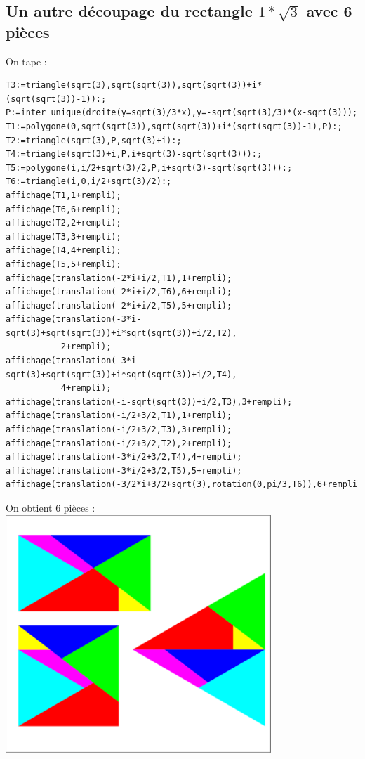\documentclass[a4paper,11pt]{book}
\begin{document}
\subsection{Un autre d\'ecoupage du rectangle $1*\sqrt3$ avec 6 pi\`eces}
On tape :
\begin{verbatim}
T3:=triangle(sqrt(3),sqrt(sqrt(3)),sqrt(sqrt(3))+i*(sqrt(sqrt(3))-1)):;
P:=inter_unique(droite(y=sqrt(3)/3*x),y=-sqrt(sqrt(3)/3)*(x-sqrt(3)));
T1:=polygone(0,sqrt(sqrt(3)),sqrt(sqrt(3))+i*(sqrt(sqrt(3))-1),P):;
T2:=triangle(sqrt(3),P,sqrt(3)+i):;
T4:=triangle(sqrt(3)+i,P,i+sqrt(3)-sqrt(sqrt(3))):;
T5:=polygone(i,i/2+sqrt(3)/2,P,i+sqrt(3)-sqrt(sqrt(3))):;
T6:=triangle(i,0,i/2+sqrt(3)/2):;
affichage(T1,1+rempli);
affichage(T6,6+rempli);
affichage(T2,2+rempli);
affichage(T3,3+rempli);
affichage(T4,4+rempli);
affichage(T5,5+rempli);
affichage(translation(-2*i+i/2,T1),1+rempli);
affichage(translation(-2*i+i/2,T6),6+rempli);
affichage(translation(-2*i+i/2,T5),5+rempli);
affichage(translation(-3*i-sqrt(3)+sqrt(sqrt(3))+i*sqrt(sqrt(3))+i/2,T2),
           2+rempli);
affichage(translation(-3*i-sqrt(3)+sqrt(sqrt(3))+i*sqrt(sqrt(3))+i/2,T4),
           4+rempli);
affichage(translation(-i-sqrt(sqrt(3))+i/2,T3),3+rempli);
affichage(translation(-i/2+3/2,T1),1+rempli);
affichage(translation(-i/2+3/2,T3),3+rempli);
affichage(translation(-i/2+3/2,T2),2+rempli);
affichage(translation(-3*i/2+3/2,T4),4+rempli);
affichage(translation(-3*i/2+3/2,T5),5+rempli);
affichage(translation(-3/2*i+3/2+sqrt(3),rotation(0,pi/3,T6)),6+rempli);
\end{verbatim}
On obtient 6 pi\`eces :\\
\includegraphics[width=10cm]{carresqrt64}
\end{document}

